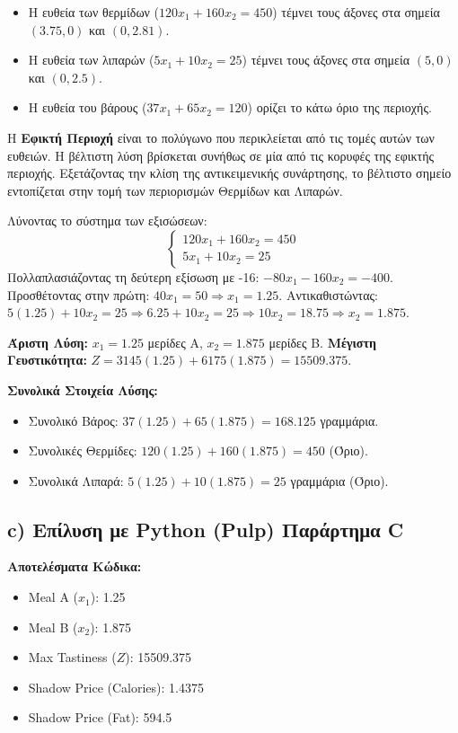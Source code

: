 \documentclass[12pt, a4paper]{article}
\begin{document}
\begin{itemize}
    \item Η ευθεία των θερμίδων ($120x_1 + 160x_2 = 450$) τέμνει τους άξονες στα σημεία $(3.75, 0)$ και $(0, 2.81)$.
    \item Η ευθεία των λιπαρών ($5x_1 + 10x_2 = 25$) τέμνει τους άξονες στα σημεία $(5, 0)$ και $(0, 2.5)$.
    \item Η ευθεία του βάρους ($37x_1 + 65x_2 = 120$) ορίζει το κάτω όριο της περιοχής.
\end{itemize}

Η \textbf{Εφικτή Περιοχή} είναι το πολύγωνο που περικλείεται από τις τομές αυτών των ευθειών. Η βέλτιστη λύση βρίσκεται συνήθως σε μία από τις κορυφές της εφικτής περιοχής. Εξετάζοντας την κλίση της αντικειμενικής συνάρτησης, το βέλτιστο σημείο εντοπίζεται στην τομή των περιορισμών Θερμίδων και Λιπαρών.

Λύνοντας το σύστημα των εξισώσεων:
$$
\begin{cases}
120x_1 + 160x_2 = 450 \\
5x_1 + 10x_2 = 25
\end{cases}
$$
Πολλαπλασιάζοντας τη δεύτερη εξίσωση με -16: $-80x_1 - 160x_2 = -400$.
Προσθέτοντας στην πρώτη: $40x_1 = 50 \Rightarrow x_1 = 1.25$.
Αντικαθιστώντας: $5(1.25) + 10x_2 = 25 \Rightarrow 6.25 + 10x_2 = 25 \Rightarrow 10x_2 = 18.75 \Rightarrow x_2 = 1.875$.

\textbf{Άριστη Λύση:} $x_1 = 1.25$ μερίδες Α, $x_2 = 1.875$ μερίδες Β.
\textbf{Μέγιστη Γευστικότητα:} $Z = 3145(1.25) + 6175(1.875) = 15509.375$.

\textbf{Συνολικά Στοιχεία Λύσης:}
\begin{itemize}
    \item Συνολικό Βάρος: $37(1.25) + 65(1.875) = 168.125$ γραμμάρια.
    \item Συνολικές Θερμίδες: $120(1.25) + 160(1.875) = 450$ (Όριο).
    \item Συνολικά Λιπαρά: $5(1.25) + 10(1.875) = 25$ γραμμάρια (Όριο).
\end{itemize}

\subsection*{c) Επίλυση με Python (Pulp) Παράρτημα C}

\textbf{Αποτελέσματα Κώδικα:}
\begin{itemize}
    \item Meal A ($x_1$): 1.25
    \item Meal B ($x_2$): 1.875
    \item Max Tastiness ($Z$): 15509.375
    \item Shadow Price (Calories): 1.4375
    \item Shadow Price (Fat): 594.5
\end{itemize}
\end{document}
